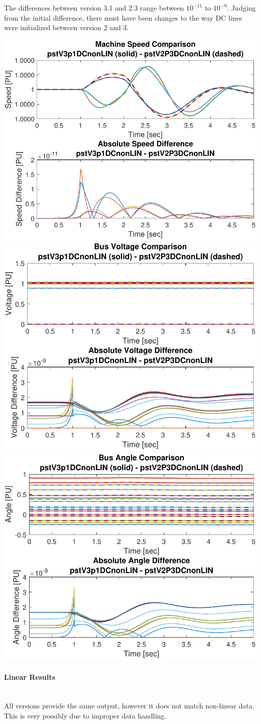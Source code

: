 \documentclass[12pt]{article}
\begin{document}
The differences between version 3.1 and 2.3 range between  $10^{-11}$ to $10^{-9}$.
Judging from the initial difference, there must have been changes to the way DC lines were initialized between version 2 and 3.

\includegraphics[width=.3\linewidth]{pstV3p1DCnonLINpstV2P3DCnonLINMacSpd} %
\includegraphics[width=.3\linewidth]{pstV3p1DCnonLINpstV2P3DCnonLINBusV} %
\includegraphics[width=.3\linewidth]{pstV3p1DCnonLINpstV2P3DCnonLINAngle} \\

\paragraph{Linear Results} \ \\
All versions provide the same output, however it does not match non-linear data.
This is very possibly due to improper data handling.
\end{document}
